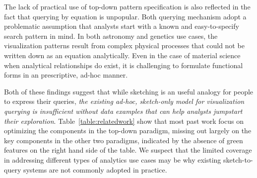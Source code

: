 \par The lack of practical use of top-down pattern specification is also reflected in the fact that querying by equation is unpopular. Both querying mechanism adopt a problematic assumption that analysts start with a known and easy-to-specify search pattern in mind. In both astronomy and genetics use cases, the visualization patterns result from complex physical processes that could not be written down as an equation analytically. Even in the case of material science when analytical relationships do exist, it is challenging to formulate functional forms in an prescriptive, ad-hoc manner.
\par Both of these findings suggest that while sketching is an useful analogy for people to express their queries, \emph{the existing ad-hoc, sketch-only model for visualization querying is insufficient without data examples that can help analysts jumpstart their exploration}. Table~\ref{table:relatedwork} show that most past work focus on optimizing the components in the top-down paradigm, missing out largely on the key components in the other two paradigms, indicated by the absence of green features on the right hand side of the table. We suspect that the limited coverage in addressing different types of analytics use cases may be why existing sketch-to-query systems are not commonly adopted in practice. %

